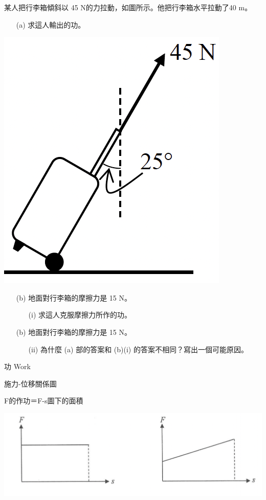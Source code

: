 \documentclass[beamer=true]{standalone}
\begin{document}
\begin{eg}
    某人把行李箱傾斜以 45 N的力拉動，如圖所示。他把行李箱水平拉動了40 m。
    \begin{itemize}
        \item[(a)] 求這人輸出的功。
    \end{itemize}
    \hfill{
        \includegraphics[width=.25\textwidth]{assets/1169635b.png}
        \par}
\end{eg}

\begin{eg}
    \begin{itemize}
        \item [(b)] 地面對行李箱的摩擦力是 15 N。
              \begin{itemize}
                  \item [(i)]求這人克服摩擦力所作的功。
              \end{itemize}
    \end{itemize}
\end{eg}

\begin{eg}
    \begin{itemize}
        \item [(b)] 地面對行李箱的摩擦力是 15 N。
              \begin{itemize}
                  \item [(ii)] 為什麼 (a) 部的答案和 (b)(i) 的答案不相同？寫出一個可能原因。
              \end{itemize}
    \end{itemize}
\end{eg}

\begin{frame}{功 Work}
    \begin{exampleblock}
        {施力-位移關係圖}
        \begin{center}
            F的作功＝F-s圖下的面積
        \end{center}
    \end{exampleblock}
    \bigskip
    {\par\centering
        \includegraphics[width=.7\textwidth]{assets/f964c556.png}
        \par}
\end{frame}
\end{document}

